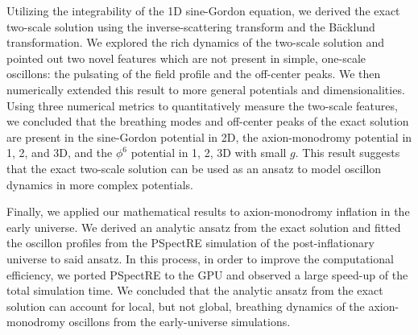 \documentclass[11pt]{book}
\begin{document}
Utilizing the integrability of the 1D sine-Gordon equation, we derived the exact two-scale solution using the inverse-scattering transform and the B\"acklund transformation. We explored the rich dynamics of the two-scale solution and pointed out two novel features which are not present in simple, one-scale oscillons: the pulsating of the field profile and the off-center peaks. We then numerically extended this result to more general potentials and dimensionalities. Using three numerical metrics to quantitatively measure the two-scale features, we concluded that the breathing modes and off-center peaks of the exact solution are present in the sine-Gordon potential in 2D, the axion-monodromy potential in 1, 2, and 3D, and the $\phi^6$ potential in 1, 2, 3D with small $g$. This result suggests that the exact two-scale solution can be used as an ansatz to model oscillon dynamics in more complex potentials.

Finally, we applied our mathematical results to axion-monodromy inflation in the early universe. We derived an analytic ansatz from the exact solution and fitted the oscillon profiles from the PSpectRE simulation of the post-inflationary universe to said ansatz. In this process, in order to improve the computational efficiency, we ported PSpectRE to the GPU and observed a large speed-up of the total simulation time. We concluded that the analytic ansatz from the exact solution can account for local, but not global, breathing dynamics of the axion-monodromy oscillons from the early-universe simulations.

\renewcommand{\bibname}{References}


\end{document}
